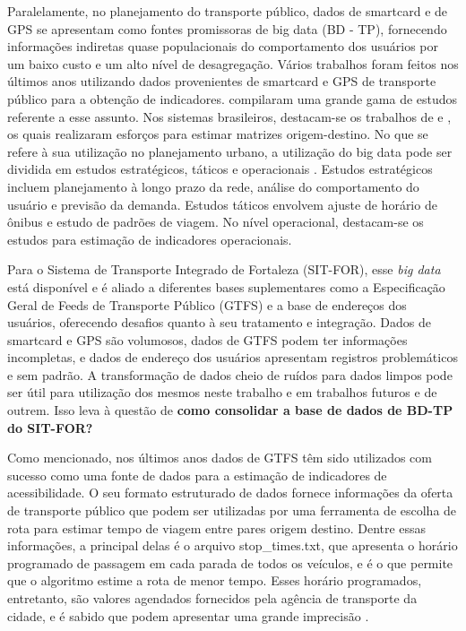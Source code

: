 \documentclass[        
    a4paper,          %
    12pt,             %
    chapter=TITLE,    %
    section=Title,    %
    subsection=Title, %
    oneside,          %
    english,          %
    spanish,          %
    brazil,           %
    fleqn             %
]{abntex2}
\begin{document}
  Paralelamente, no planejamento do transporte público, dados de smartcard e de GPS se apresentam como fontes promissoras de big data (BD - TP), fornecendo informações indiretas quase populacionais do comportamento dos usuários por um baixo custo e um alto nível de desagregação. Vários trabalhos foram feitos nos últimos anos utilizando dados provenientes de smartcard e GPS de transporte público para a obtenção de indicadores. \citet{Kurauchi2017} compilaram uma grande gama de estudos referente a esse assunto. Nos sistemas brasileiros, destacam-se os trabalhos de \citet{Farzin2008} e \citet{Arbex2017}, os quais realizaram esforços para estimar matrizes origem-destino. No que se refere à sua utilização no planejamento urbano, a utilização do big data pode ser dividida em estudos estratégicos, táticos e operacionais \citep{Pelletier2011}. Estudos estratégicos incluem planejamento à longo prazo da rede, análise do comportamento do usuário e previsão da demanda. Estudos táticos envolvem ajuste de horário de ônibus e estudo de padrões de viagem. No nível operacional, destacam-se os estudos para estimação de indicadores operacionais.
  
  Para o Sistema de Transporte Integrado de Fortaleza (SIT-FOR), esse \emph{big data} está disponível e é aliado a diferentes bases suplementares como a Especificação Geral de Feeds de Transporte Público (GTFS) e a base de endereços dos usuários, oferecendo desafios quanto à seu tratamento e integração. Dados de smartcard e GPS são volumosos, dados de GTFS podem ter informações incompletas, e dados de endereço dos usuários apresentam registros problemáticos e sem padrão. A transformação de dados cheio de ruídos para dados limpos pode ser útil para utilização dos mesmos neste trabalho e em trabalhos futuros e de outrem. Isso leva à questão de \textbf{como consolidar a base de dados de BD-TP do SIT-FOR?}
  
  Como mencionado, nos últimos anos dados de GTFS têm sido utilizados com sucesso como uma fonte de dados para a estimação de indicadores de acessibilidade. O seu formato estruturado de dados fornece informações da oferta de transporte público que podem ser utilizadas por uma ferramenta de escolha de rota para estimar tempo de viagem entre pares origem destino. Dentre essas informações, a principal delas é o arquivo stop\_times.txt, que apresenta o horário programado de passagem em cada parada de todos os veículos, e é o que permite que o algoritmo estime a rota de menor tempo. Esses horário programados, entretanto, são valores agendados fornecidos pela agência de transporte da cidade, e é sabido que podem apresentar uma grande imprecisão \citep{Wessel2019}.
  
\end{document}
